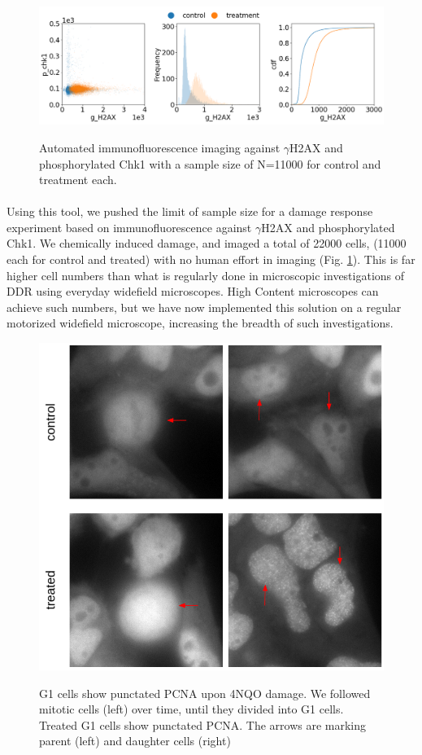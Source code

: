 \begin{figure}[H]
    {\hfill\includegraphics[clip, width=1\linewidth]{figures/ncs.png}\hspace*{\fill}}
    \caption{Automated immunofluorescence imaging against $\gamma$H2AX and phosphorylated Chk1 with a sample size of N=11000 for control and treatment each.}
    {\label{fig:ncs}}
\end{figure}

\paragraph*{} Using this tool, we pushed the limit of sample size for a damage response experiment based on immunofluorescence against $\gamma$H2AX and phosphorylated Chk1. We chemically induced damage, and imaged a total of 22000 cells, (11000 each for control and treated) with no human effort in imaging (Fig. \ref{fig:ncs}). This is far higher cell numbers than what is regularly done in microscopic investigations of DDR using everyday widefield microscopes. High Content microscopes can achieve such numbers, but we have now implemented this solution on a regular motorized widefield microscope, increasing the breadth of such investigations.

\begin{figure}[H]
    {\hfill\includegraphics[clip, width=0.8\linewidth]{figures/g1.png}\hspace*{\fill}}
    \caption{G1 cells show punctated PCNA upon 4NQO damage. We followed mitotic cells (left) over time, until they divided into G1 cells. Treated G1 cells show punctated PCNA. The arrows are marking parent (left) and daughter cells (right)}
    {\label{fig:g1}}
\end{figure}

